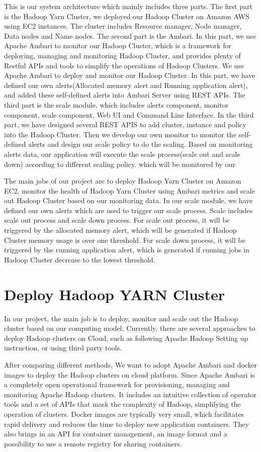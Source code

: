 \documentclass{article}
\begin{document}
This is our system architecture which mainly includes three parts. The first part is the Hadoop Yarn Cluster, we deployed our Hadoop Cluster on Amazon AWS using EC2 instances. The cluster includes Resource manager, Node manager, Data nodes and Name nodes. The second part is the Ambari. In this part, we use Apache Ambari to monitor our Hadoop Cluster, which is a framework for deploying, managing and monitoring Hadoop Cluster, and provides plenty of Restful APIs and tools to simplify the operations of Hadoop Clusters. We use Apache Ambari to deploy and monitor our Hadoop Cluster. In this part, we have defined our own alerts(Allocated memory alert and Running application alert), and added these self-defined alerts into Ambari Server using REST APIs. The third part is the scale module, which includes alerts component, monitor component, scale component, Web UI and Command Line Interface. In the third part, we have designed several REST APIS to add cluster, instance and policy into the Hadoop Cluster. Then we develop our own monitor to monitor the self-defined alerts and design our scale policy to do the scaling. Based on monitoring alerts data, our application will execute the scale process(scale out and scale down) according to different scaling policy. which will be monitored by our 

The main jobs of our project are to deploy Hadoop Yarn Cluster on Amazon EC2, monitor the health of Hadoop Yarn Cluster using Ambari metrics and scale out Hadoop Cluster based on our monitoring data. In our scale module, we have defined our own alerts which are used to trigger our scale process. Scale includes scale out process and scale down process. For scale out process, it will be triggered by the allocated memory alert, which will be generated if Hadoop Cluster memory usage is over one threshold. For scale down process, it will be triggered by the running application alert, which is generated if running jobs in Hadoop Cluster decrease to the lowest threshold.

\section{Deploy Hadoop YARN Cluster}
In our project, the main job is to deploy, monitor and scale out the Hadoop cluster based on our computing model. Currently, there are several approaches to deploy Hadoop clusters on Cloud, such as following Apache Hadoop Setting up instruction, or using third party tools.

After comparing different methods, We want to adopt Apache Ambari and docker images to deploy the Hadoop clusters on cloud platform. Since Apache Ambari is a completely open operational framework for provisioning, managing and monitoring Apache Hadoop clusters. It includes an intuitive collection of operator tools and a set of APIs that mask the complexity of Hadoop, simplifying the operation of clusters. Docker images are typically very small, which facilitates rapid delivery and reduces the time to deploy new application containers. They also brings in an API for container management, an image format and a possibility to use a remote registry for sharing containers.
\end{document}
